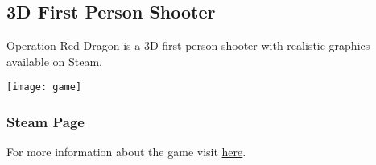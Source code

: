 \vspace{2cm}

  \subsection{3D First Person Shooter}
    Operation Red Dragon is a 3D first person shooter with realistic graphics available on Steam.
    \begin{center}
      \texttt{[image: game]}
    \end{center}
    \subsubsection{Steam Page}
      For more information about the game visit \href{https://store.steampowered.com/app/747730/Operation_Red_Dragon/}{here}.